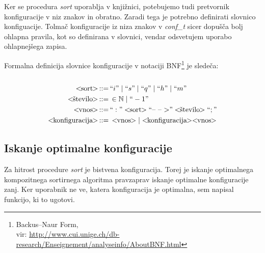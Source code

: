 \documentclass[a4paper,oneside,12pt]{article}
\def\N{\mathbb N}
\def\ali{\;|\;}
\newenvironment{BNF}{
    \\
    \Sbox
    \minipage{12cm}
}{
    \endminipage
    \endSbox
    \minipage{\textwidth}
    \vspace*{5pt}
    \begin{center}
        \fcolorbox{white}{white}{
            \TheSbox
        }
    \end{center}
    \vspace*{5pt}
    \endminipage
}
\def\bnfassign:{\,::=&\,}
\newcommand{\q}[1]{\text{``}#1\text{''}}
\newcommand{\ntm}[1]{\ensuremath{<\!\!\text{#1}\!\!>}}
\newcommand{\abnf}[2]{\ensuremath{\ntm{#1} \bnfassign: #2}}
\begin{document}
Ker se procedura \emph{sort} uporablja v knjižnici, potebujemo tudi pretvornik
konfiguracije v niz znakov in obratno. Zaradi tega je potrebno definirati slovnico
konfiguacije. Tolmač konfiguracije iz niza znakov v \emph{conf\_t} sicer dopušča bolj ohlapna pravila, kot so
definirana v slovnici, vendar odsvetujem uporabo ohlapnejšega zapisa.

Formalna definicija slovnice konfiguracije v notaciji
BNF\footnote{Backus--Naur Form,\\ vir: \url{http://www.cui.unige.ch/db-research/Enseignement/analyseinfo/AboutBNF.html}} 
je sledeča: %
\\
\begin{BNF} %
  \begin{align*}
    \abnf{sort}{\q{i} \ali \q{s} \ali \q{q} \ali \q{h} \ali \q{m}}\\
    \abnf{število}{\in \N \ali \q{-1}} \\
    \abnf{vnos}{\q{:}\ntm{sort}\q{\mbox{--}\ \mbox{--}\ \mbox{$>$}}\ntm{število}\q{;}}\\
    \abnf{konfiguracija}{\ntm{vnos} | \ntm{konfiguracija}\ntm{vnos}}
  \end{align*}
\end{BNF}

\subsection{Iskanje optimalne konfiguracije}
\label{chapter:optimalconf}
Za hitrost procedure \emph{sort} je bistvena konfiguracija.
Torej je iskanje optimalnega kompozitnega sortirnega algoritma pravzaprav iskanje optimalne
konfiguracije zanj. Ker uporabnik ne ve, katera konfiguracija je optimalna, sem napisal
funkcijo, ki to ugotovi. 
\end{document}

